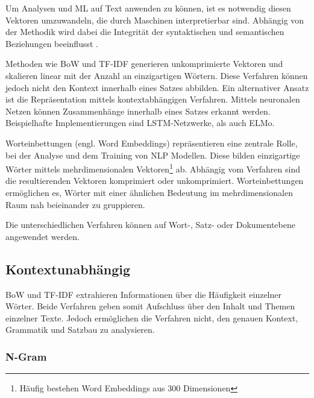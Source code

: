 
Um Analysen und \ac{ML} auf Text anwenden zu können, ist es notwendig diesen Vektoren umzuwandeln, die durch Maschinen interpretierbar sind. Abhängig von der Methodik wird dabei die Integrität der syntaktischen und semantischen Beziehungen beeinflusst \autocite{kowsari_text_2019, jurafsky_speech_2023}.

Methoden wie \ac{BoW} und \ac{TF-IDF} generieren unkomprimierte Vektoren und skalieren linear mit der Anzahl an einzigartigen Wörtern. Diese Verfahren können jedoch nicht den Kontext innerhalb eines Satzes abbilden. Ein alternativer Ansatz ist die Repräsentation mittels kontextabhängigen Verfahren. Mittels neuronalen Netzen können Zusammenhänge innerhalb eines Satzes erkannt werden. Beispielhafte Implementierungen sind \ac{LSTM}-Netzwerke, als auch \ac{ELMo}.


Worteinbettungen (engl. Word Embeddings) repräsentieren eine zentrale Rolle, bei der Analyse und dem Training von \ac{NLP} Modellen. Diese bilden einzigartige Wörter mittels mehrdimensionalen Vektoren\footnote{Häufig bestehen Word Embeddings aus \num{300} Dimensionen} ab. Abhängig vom Verfahren sind die resultierenden Vektoren komprimiert oder unkomprimiert. Worteinbettungen ermöglichen es, Wörter mit einer ähnlichen Bedeutung im mehrdimensionalen Raum nah beieinander zu gruppieren.

Die unterschiedlichen Verfahren können auf Wort-, Satz- oder Dokumentebene angewendet werden.

\subsection{Kontextunabhängig}

\ac{BoW} und \ac{TF-IDF} extrahieren Informationen über die Häufigkeit einzelner Wörter. Beide Verfahren geben somit Aufschluss über den Inhalt und Themen einzelner Texte. Jedoch ermöglichen die Verfahren nicht, den genauen Kontext, Grammatik und Satzbau zu analysieren. 


\subsubsection*{N-Gram}

